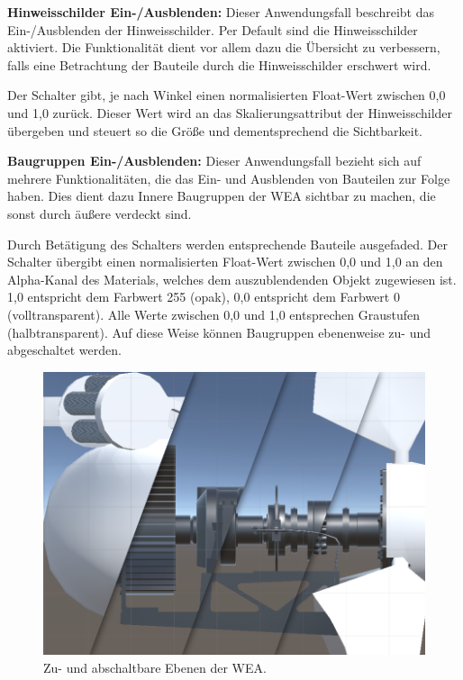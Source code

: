\textbf{Hinweisschilder Ein-/Ausblenden:} Dieser Anwendungsfall beschreibt das  Ein-/Ausblenden der Hinweisschilder. Per Default sind die Hinweisschilder aktiviert. Die Funktionalität dient vor allem dazu die Übersicht zu verbessern, falls eine Betrachtung der Bauteile durch die Hinweisschilder erschwert wird. 

Der Schalter gibt, je nach Winkel einen normalisierten Float-Wert zwischen 0,0 und 1,0 zurück. Dieser Wert wird an das Skalierungsattribut der Hinweisschilder übergeben und steuert so die Größe und dementsprechend die Sichtbarkeit.  

\textbf{Baugruppen Ein-/Ausblenden:} Dieser Anwendungsfall bezieht sich auf mehrere Funktionalitäten, die das Ein- und Ausblenden von Bauteilen zur Folge haben. Dies dient dazu Innere Baugruppen der WEA sichtbar zu machen, die sonst durch äußere verdeckt sind.

Durch Betätigung des Schalters werden entsprechende Bauteile ausgefaded. Der Schalter übergibt einen normalisierten Float-Wert zwischen 0,0 und 1,0 an den Alpha-Kanal des Materials, welches dem auszublendenden Objekt zugewiesen ist. 1,0 entspricht dem Farbwert 255 (opak), 0,0 entspricht dem Farbwert 0 (volltransparent). Alle Werte zwischen 0,0 und 1,0 entsprechen Graustufen (halbtransparent). Auf diese Weise können Baugruppen ebenenweise zu- und abgeschaltet werden. 

\begin{figure}[H]
	\centering
	\captionsetup{width=1\textwidth}
	\includegraphics[keepaspectratio, width=1\textwidth]{bildquellen/baugruppen_klein}
	\caption{Zu- und abschaltbare Ebenen der WEA.}
	\label{fig:4.2}
\end{figure}



